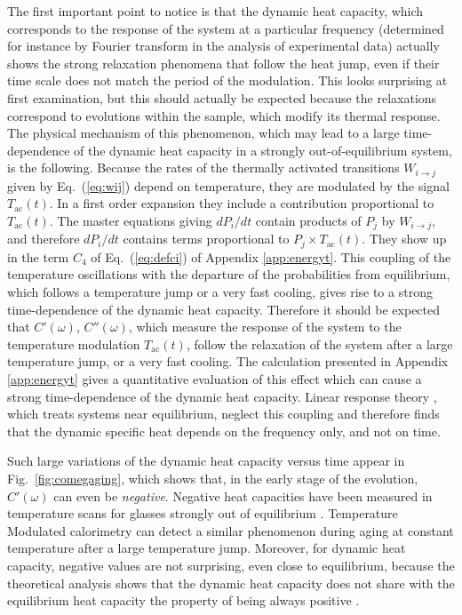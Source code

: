 \documentclass[pre,a4paper,twocolumn,superscriptaddress,%
floatfix]{revtex4}
\begin{document}
\medskip
The first important point to notice is that the dynamic heat capacity,
which corresponds to the response of the system at a particular
frequency (determined for instance by Fourier transform in the analysis of
experimental data) actually shows the strong relaxation phenomena that
follow the heat jump, even if their time scale does not match the period of
the modulation. This looks surprising at first examination, but this should
actually be expected because the relaxations correspond to evolutions within
the sample, which modify its thermal response.
The physical mechanism of this phenomenon, which may
  lead to a large time-dependence of the dynamic heat capacity in a strongly
  out-of-equilibrium system, is the
following. Because the rates of the thermally activated transitions
$ W_{i \to j}$ given by Eq.~(\ref{eq:wij}) depend on temperature, they are
modulated by the signal $T_{\mathrm{ac}}(t)$. In a first order expansion
they include a contribution proportional to $T_{\mathrm{ac}}(t)$. The
master equations giving $dP_i/dt$ contain products of $P_j$
by $W_{i \to j}$, and therefore $dP_i/dt$ contains terms proportional
to $P_j \times T_{\mathrm{ac}}(t)$. They show up in the term $C_4$ of
Eq.~(\ref{eq:defci}) of Appendix \ref{app:energyt}. This coupling of the
temperature oscillations with the departure of the probabilities
from equilibrium, which follows a temperature jump or a very fast cooling,
gives rise to a strong time-dependence of the dynamic heat capacity.
Therefore it should be expected that $C'(\omega)$, $C''(\omega)$, which
measure the response of the system to the temperature modulation
$T_{\mathrm{ac}}(t)$, follow the relaxation of the system after a large
temperature jump, or a very fast cooling. The calculation presented in
Appendix \ref{app:energyt} gives a quantitative evaluation of this
effect which can cause a strong time-dependence of the dynamic heat capacity.
Linear response theory \cite{NIELSEN},
which treats systems near equilibrium, neglect this
coupling  and therefore finds that the dynamic specific heat depends
on the frequency only, and not on time.

Such large variations of the dynamic heat capacity versus time appear in
Fig.~\ref{fig:comegaging}, which shows that, in the
early stage of the evolution, $C'(\omega)$ can even be {\em negative}.
Negative heat capacities have been measured in temperature scans for glasses
strongly out of equilibrium \cite{THOMAS1931}. Temperature Modulated
calorimetry can detect 
a similar phenomenon during aging at constant temperature after a large
temperature jump.
Moreover, for dynamic heat capacity, negative values are not
surprising, even close to equilibrium, because the theoretical analysis shows
that the dynamic heat capacity does not share with the equilibrium heat
capacity the property of being always positive \cite{FIORE}.
\end{document}
